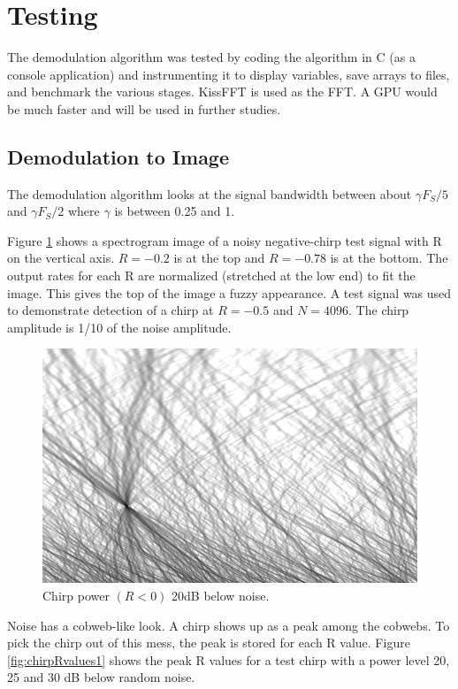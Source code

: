 \section{Testing}

The demodulation algorithm was tested by coding the algorithm in C (as a console
application) and instrumenting it to display variables,
save arrays to files, and benchmark the various stages.
KissFFT is used as the FFT.
A GPU would be much faster and will be used in further studies.

\subsection{Demodulation to Image}

The demodulation algorithm looks at the signal bandwidth between about
$\gamma F_S/5$ and $\gamma F_S/2$ where $\gamma$ is between 0.25 and 1.

Figure \ref{fig:chirpTest1} shows a spectrogram image of a noisy
negative-chirp test signal with R on the vertical axis.
$R=-0.2$ is at the top and $R=-0.78$ is at the bottom.
The output rates for each R are normalized (stretched at the low end)
to fit the image.
This gives the top of the image a fuzzy appearance.
A test signal was used to demonstrate detection of a chirp at
$R=-0.5$ and $N=4096$.
The chirp amplitude is 1/10 of the noise amplitude.
\begin{figure}
  \includegraphics[width=\linewidth]{../source/chirp42m.jpg}
  \caption{Chirp power $(R<0)$ 20dB below noise.}
  \label{fig:chirpTest1}
\end{figure}

Noise has a cobweb-like look. A chirp shows up as a peak among the cobwebs.
To pick the chirp out of this mess, the peak is stored for each R value.
Figure \ref{fig:chirpRvalues1} shows the peak R values for a test chirp with a
power level 20, 25 and 30 dB below random noise.

